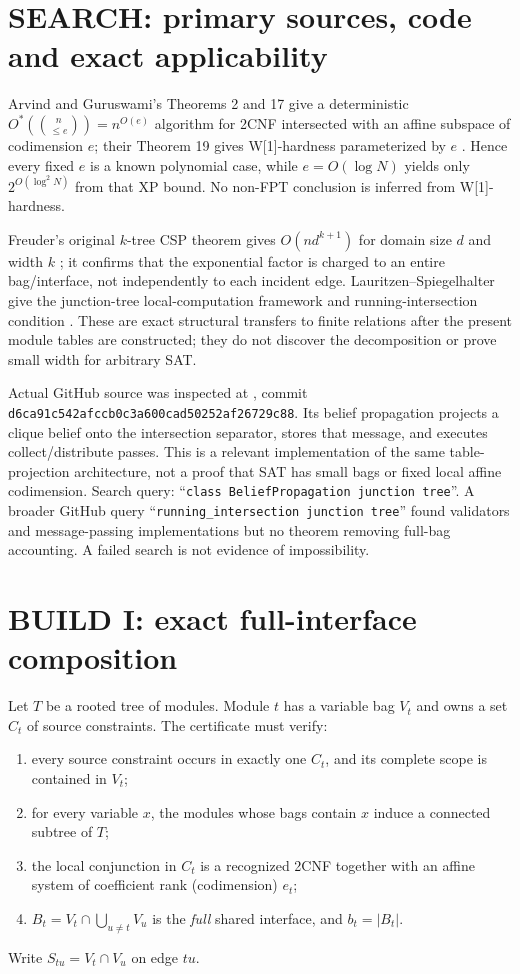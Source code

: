 \documentclass[11pt]{article}
\begin{document}
\section{SEARCH: primary sources, code and exact applicability}
Arvind and Guruswami's Theorems 2 and 17 give a deterministic
$O^*(\binom{n}{\le e})=n^{O(e)}$ algorithm for 2CNF intersected with an
affine subspace of codimension $e$; their Theorem 19 gives W[1]-hardness
parameterized by $e$ \cite{AG}.  Hence every fixed $e$ is a known polynomial
case, while $e=O(\log N)$ yields only $2^{O(\log^2N)}$ from that XP bound.
No non-FPT conclusion is inferred from W[1]-hardness.

Freuder's original $k$-tree CSP theorem gives $O(nd^{k+1})$ for domain size
$d$ and width $k$ \cite{Freuder}; it confirms that the exponential factor is
charged to an entire bag/interface, not independently to each incident edge.
Lauritzen--Spiegelhalter give the junction-tree local-computation framework
and running-intersection condition \cite{LS}.  These are exact structural
transfers to finite relations after the present module tables are constructed;
they do not discover the decomposition or prove small width for arbitrary SAT.

Actual GitHub source was inspected at
, commit
\texttt{d6ca91c542afccb0c3a600cad50252af26729c88}.  Its belief propagation
projects a clique belief onto the intersection separator, stores that message,
and executes collect/distribute passes.  This is a relevant implementation of
the same table-projection architecture, not a proof that SAT has small bags or
fixed local affine codimension.  Search query:
``\texttt{class BeliefPropagation junction tree}''.  A broader GitHub query
``\texttt{running\_intersection junction tree}'' found validators and
message-passing implementations but no theorem removing full-bag accounting.
A failed search is not evidence of impossibility.

\section{BUILD I: exact full-interface composition}
Let $T$ be a rooted tree of modules.  Module $t$ has a variable bag $V_t$ and
owns a set $C_t$ of source constraints.  The certificate must verify:
\begin{enumerate}
\item every source constraint occurs in exactly one $C_t$, and its complete
scope is contained in $V_t$;
\item for every variable $x$, the modules whose bags contain $x$ induce a
connected subtree of $T$;
\item the local conjunction in $C_t$ is a recognized 2CNF together with an
affine system of coefficient rank (codimension) $e_t$;
\item $B_t=V_t\cap\bigcup_{u\ne t}V_u$ is the \emph{full} shared interface,
and $b_t=|B_t|$.
\end{enumerate}
Write $S_{tu}=V_t\cap V_u$ on edge $tu$.
\end{document}
